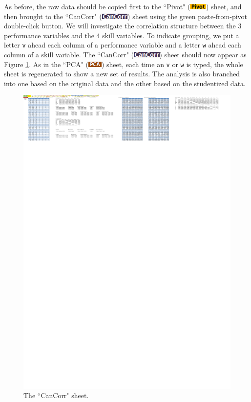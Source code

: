 \documentclass[article]{jss}
\numberwithin{equation}{subsection}
\newcommand{\shtPivot}{``Pivot" (\includegraphics[height=8pt, keepaspectratio=true]{PivotSheetTab_png}) }
\newcommand{\shtCanCorr}{``CanCorr" (\includegraphics[height=8pt, keepaspectratio=true]{CanCorrSheetTab_png}) }
\newcommand{\shtPCA}{``PCA" (\includegraphics[height=8pt, keepaspectratio=true]{PcaSheetTab_png}) }
\begin{document}
        As before, the raw data should be copied first to the \shtPivot sheet, and then brought to the \shtCanCorr sheet using the green paste-from-pivot double-click button. We will investigate the correlation structure between the 3 performance variables and the 4 skill variables. To indicate grouping, we put a letter \texttt{v} ahead each column of a performance variable and a letter \texttt{w} ahead each column of a skill variable. The \shtCanCorr sheet should now appear as Figure \ref{fig:The CanCorr sheet}. As in the \shtPCA sheet, each time an \texttt{v} or \texttt{w} is typed, the whole sheet is regenerated to show a new set of results. The analysis is also branched into one based on the original data and the other based on the studentized data.
        \begin{figure}[!tbh]
        	\includegraphics[width=\linewidth,keepaspectratio=true]{img/CanCorrSheetOutput}
        	\vspace{-20pt}\centering{}\protect\caption{The ``CanCorr" sheet.}\label{fig:The CanCorr sheet}
        \end{figure}
        
\end{document}

